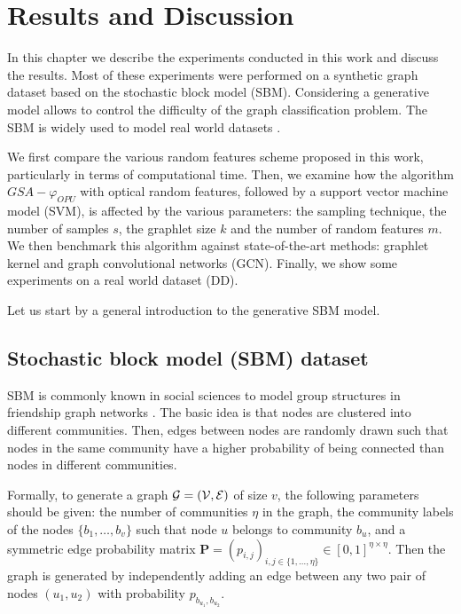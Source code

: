 \addchapheadtotoc
\chapter{Results and Discussion}
In this chapter we describe the experiments conducted in this work and discuss the results. Most of these experiments were performed on a synthetic graph dataset based on the stochastic block model (SBM). Considering a generative model allows to control the difficulty of the graph classification problem. The SBM is widely used to model real world datasets \citep{SBM}.

We first compare the various random features scheme proposed in this work, particularly in terms of computational time. Then, we examine how the algorithm $GSA-\varphi_{OPU}$ with optical random features, followed by a support vector machine model (SVM), is affected by the various parameters: the sampling technique, the number of samples $s$, the graphlet size $k$ and the number of random features $m$.
We then benchmark this algorithm against state-of-the-art methods: graphlet kernel and graph convolutional networks (GCN). %
Finally, we show some experiments on a real world dataset (DD). 

Let us start by a general introduction to the generative SBM model.
 
\section{Stochastic block model (SBM) dataset}

SBM is commonly known in social sciences to model group structures in friendship graph networks \citep{SBM}. The basic idea is that nodes are clustered into different communities. Then, edges between nodes are randomly drawn such that nodes in the same community have a higher probability of being connected than nodes in different communities.

Formally, to generate a graph $\mathcal{G}=(\mathcal{V},\mathcal{E})$ of size $v$, the following parameters should be given: the number of communities $\eta$ in the graph, the community labels of the nodes $\{b_1 , \ldots ,b_v\}$ such that node $u$ belongs to community $b_u$, and a symmetric edge probability matrix $\mathbf{P}=(p_{i,j})_{i,j\in\{1,\ldots, \eta\}} \in [0,1]^{\eta \times \eta}$.
Then the graph is generated by independently adding an edge between any two pair of nodes $(u_1,u_2)$ with probability $p_{b_{u_1} , b_{u_2}}$.

